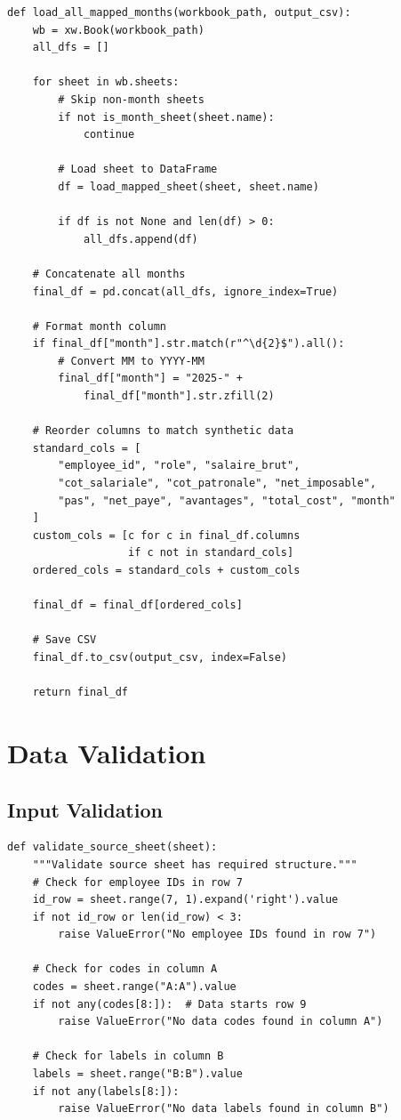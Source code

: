 \begin{lstlisting}[style=pythonstyle, caption=CSV Conversion Process]
def load_all_mapped_months(workbook_path, output_csv):
    wb = xw.Book(workbook_path)
    all_dfs = []
    
    for sheet in wb.sheets:
        # Skip non-month sheets
        if not is_month_sheet(sheet.name):
            continue
        
        # Load sheet to DataFrame
        df = load_mapped_sheet(sheet, sheet.name)
        
        if df is not None and len(df) > 0:
            all_dfs.append(df)
    
    # Concatenate all months
    final_df = pd.concat(all_dfs, ignore_index=True)
    
    # Format month column
    if final_df["month"].str.match(r"^\d{2}$").all():
        # Convert MM to YYYY-MM
        final_df["month"] = "2025-" + 
            final_df["month"].str.zfill(2)
    
    # Reorder columns to match synthetic data
    standard_cols = [
        "employee_id", "role", "salaire_brut",
        "cot_salariale", "cot_patronale", "net_imposable",
        "pas", "net_paye", "avantages", "total_cost", "month"
    ]
    custom_cols = [c for c in final_df.columns 
                   if c not in standard_cols]
    ordered_cols = standard_cols + custom_cols
    
    final_df = final_df[ordered_cols]
    
    # Save CSV
    final_df.to_csv(output_csv, index=False)
    
    return final_df
\end{lstlisting}

\section{Data Validation}

\subsection{Input Validation}

\begin{lstlisting}[style=pythonstyle]
def validate_source_sheet(sheet):
    """Validate source sheet has required structure."""
    # Check for employee IDs in row 7
    id_row = sheet.range(7, 1).expand('right').value
    if not id_row or len(id_row) < 3:
        raise ValueError("No employee IDs found in row 7")
    
    # Check for codes in column A
    codes = sheet.range("A:A").value
    if not any(codes[8:]):  # Data starts row 9
        raise ValueError("No data codes found in column A")
    
    # Check for labels in column B
    labels = sheet.range("B:B").value
    if not any(labels[8:]):
        raise ValueError("No data labels found in column B")
\end{lstlisting}

